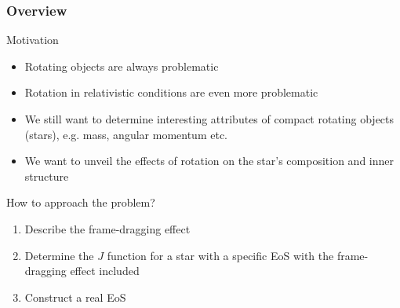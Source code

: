 \begin{frame}
\frametitle{Overview}

\begin{block}{Motivation}
	\begin{itemize}
		\item Rotating objects are always problematic
		\item Rotation in relativistic conditions are even more problematic
		\item We still want to determine interesting attributes of compact rotating objects (stars), e.g. mass, angular momentum etc.
		\item We want to unveil the effects of rotation on the star's composition and inner structure
	\end{itemize}
\end{block}

\begin{exampleblock}{How to approach the problem?}
	\begin{enumerate}
		\item Describe the frame-dragging effect
		\item Determine the $J$ function for a star with a specific EoS with the frame-dragging effect included
		\item Construct a real EoS
	\end{enumerate}
\end{exampleblock}

\end{frame}